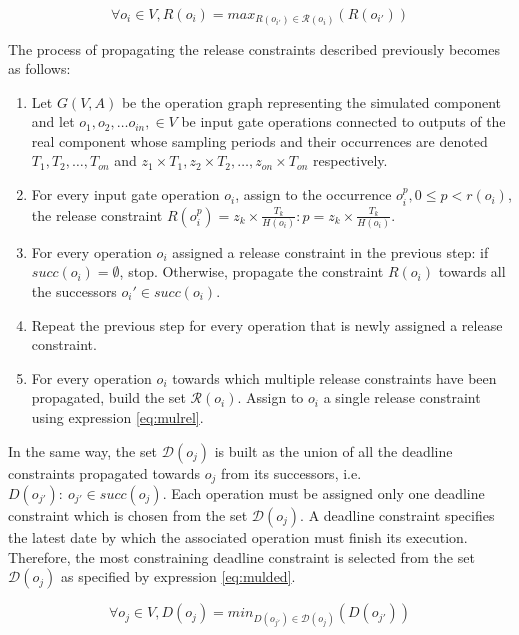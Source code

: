 \begin{equation}
\forall o_i \in V, R(o_i) = max_{R(o_{i'}) \in \mathcal{R}(o_i)}(R(o_{i'}))
\label{eq:mulrel}
\end{equation}

The process of propagating the release constraints described previously becomes as follows:

\begin{enumerate}
\item Let $G(V,A)$ be the operation graph representing the simulated component and let $o_{1}, o_{2}, \ldots o_{in},\in  V$ be input gate operations connected to outputs of the real component whose sampling periods and their occurrences are denoted $T_{1}, T_{2}, \ldots, T_{on}$ and $z_1 \times T_1, z_2 \times T_2, \ldots, z_{on} \times T_{on}$ respectively.
\item For every input gate operation $o_{i}$, assign to the occurrence $o_{i}^{p}, 0 \leq p < r(o_{i})$, the release constraint $R(o_{i}^{p}) = z_k \times \frac{T_k}{H(o_{i})}: p = z_k \times \frac{T_{k}}{H(o_{i})}$.
\item For every operation $o_i$ assigned a release constraint in the previous step: if $succ(o_i) = \emptyset$, stop. Otherwise, propagate the constraint $R(o_i)$ towards all the successors $o_i' \in succ(o_i)$.
\item Repeat the previous step for every operation that is newly assigned a release constraint.
\item For every operation $o_i$ towards which multiple release constraints have been propagated, build the set $\mathcal{R}(o_i)$. Assign to $o_i$ a single release constraint using expression \ref{eq:mulrel}.
\end{enumerate}

In the same way, the set $\mathcal{D}(o_j)$ is built as the union of all the deadline constraints propagated towards $o_j$ from its successors, i.e. $D(o_{j'}):\ o_{j'} \in succ(o_j)$. Each operation must be assigned only one deadline constraint which is chosen from the set $\mathcal{D}(o_j)$. A deadline constraint specifies the latest date by which the associated operation must finish its execution. Therefore, the most constraining deadline constraint is selected from the set $\mathcal{D}(o_j)$ as specified by expression \ref{eq:mulded}.

\begin{equation}
\forall o_j \in V, D(o_j) = min_{D(o_{j'}) \in \mathcal{D}(o_j) }(D(o_{j'}))
\label{eq:mulded}
\end{equation}

